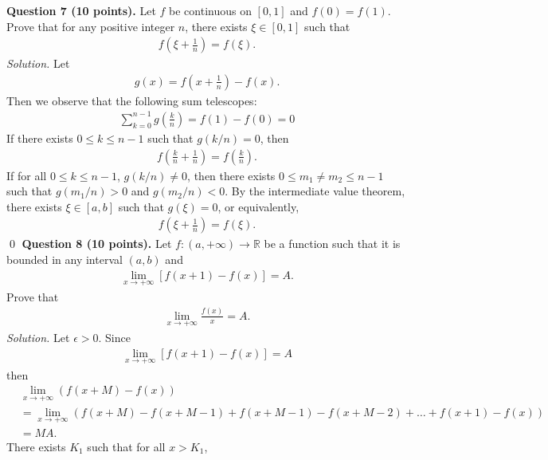 \documentclass[11pt]{amsart}
\theoremstyle{plain}
\numberwithin{equation}{section}
\begin{document}
\noindent\textbf{Question 7 (10 points).} Let $f$ be continuous on $[0,1]$ and $f(0)=f(1)$. Prove that for any positive integer $n$, there exists $\xi\in[0,1]$ such that
\begin{align*}
    f\left(\xi+\frac{1}{n}\right)=f\left(\xi\right).
\end{align*}
\textit{Solution.} Let 
\begin{align*}
    g(x)=f\left(x+\frac{1}{n}\right)-f(x).
\end{align*}
Then we observe that the following sum telescopes:
\begin{align*}
    \sum_{k=0}^{n-1}g\left(\frac{k}{n}\right)=f(1)-f(0)=0
\end{align*}
If there exists $0\leq k\leq n-1$ such that $g\left(k/n\right)=0$, then
\begin{align*}
    f\left(\frac{k}{n}+\frac{1}{n}\right)=f\left(\frac{k}{n}\right).
\end{align*}
If for all $0\leq k\leq n-1$, $g\left(k/n\right)\neq 0$, then there exists $0\leq m_{1}\neq m_{2}\leq n-1$ such that $g\left(m_{1}/n\right)>0$ and $g\left(m_{2}/n\right)<0$. By the intermediate value theorem, there exists $\xi\in[a,b]$ such that $g\left(\xi\right)=0$, or equivalently, 
\begin{align*}
    f\left(\xi+\frac{1}{n}\right)=f\left(\xi\right).
\end{align*}
\qed 
\newline
\newline\textbf{Question 8 (10 points).} Let $f:\left(a,+\infty\right)\longrightarrow\mathbb{R}$ be a function such that it is bounded in any interval $(a,b)$ and 
\begin{align*}
    \lim_{x\to+\infty}\left[f(x+1)-f(x)\right]=A.
\end{align*}
Prove that
\begin{align*}
    \lim_{x\to+\infty}\frac{f(x)}{x}=A.
\end{align*}
\textit{Solution.} 
Let $\epsilon>0$. Since 
\begin{align*}
    \lim_{x\to+\infty}\left[f(x+1)-f(x)\right]=A
\end{align*}
then 
\begin{align*}
    &\lim_{x\to+\infty}\left(f(x+M)-f(x)\right)
    \\
    &=\lim_{x\to+\infty}\left(f(x+M)-f(x+M-1)+f(x+M-1)-f(x+M-2)+\dots+f(x+1)-f(x)\right)
    \\
    &=MA.
\end{align*}
There exists $K_{1}$ such that for all $x>K_{1}$,
\end{document}

